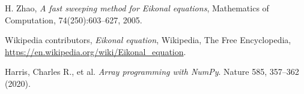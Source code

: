 \documentclass[11pt]{article}
\theoremstyle{definition}
\theoremstyle{remark}
\begin{document}
\begin{thebibliography}{9}

H. Zhao, 
\textit{A fast sweeping method for Eikonal equations},
Mathematics of Computation, 74(250):603–627, 2005.

Wikipedia contributors, 
\textit{Eikonal equation}, 
Wikipedia, The Free Encyclopedia, 
\href{https://en.wikipedia.org/wiki/Eikonal_equation}{https://en.wikipedia.org/wiki/Eikonal\_equation}.

Harris, Charles R., et al. 
\textit{Array programming with NumPy}. 
Nature 585, 357–362 (2020).


\end{thebibliography}
\end{document}
